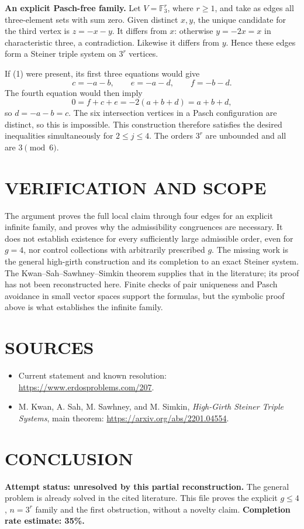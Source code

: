 \textbf{An explicit Pasch-free family.} Let $V=\mathbb F_3^r$, where $r\geq1$, and take as edges all three-element sets with sum zero. Given distinct $x,y$, the unique candidate for the third vertex is $z=-x-y$. It differs from $x$: otherwise $y=-2x=x$ in characteristic three, a contradiction. Likewise it differs from $y$. Hence these edges form a Steiner triple system on $3^r$ vertices.

If (1) were present, its first three equations would give
\[
c=-a-b,\qquad e=-a-d,\qquad f=-b-d.
\]
The fourth equation would then imply
\[
0=f+c+e=-2(a+b+d)=a+b+d,
\]
so $d=-a-b=c$. The six intersection vertices in a Pasch configuration are distinct, so this is impossible. This construction therefore satisfies the desired inequalities simultaneously for $2\leq j\leq4$. The orders $3^r$ are unbounded and all are $3\pmod6$.

\section{VERIFICATION AND SCOPE}
The argument proves the full local claim through four edges for an explicit infinite family, and proves why the admissibility congruences are necessary. It does not establish existence for every sufficiently large admissible order, even for $g=4$, nor control collections with arbitrarily prescribed $g$. The missing work is the general high-girth construction and its completion to an exact Steiner system. The Kwan--Sah--Sawhney--Simkin theorem supplies that in the literature; its proof has not been reconstructed here. Finite checks of pair uniqueness and Pasch avoidance in small vector spaces support the formulas, but the symbolic proof above is what establishes the infinite family.

\section{SOURCES}
\begin{itemize}
\item Current statement and known resolution: \url{https://www.erdosproblems.com/207}.
\item M. Kwan, A. Sah, M. Sawhney, and M. Simkin, \emph{High-Girth Steiner Triple Systems}, main theorem: \url{https://arxiv.org/abs/2201.04554}.
\end{itemize}
\section{CONCLUSION}
\textbf{Attempt status: unresolved by this partial reconstruction.} The general problem is already solved in the cited literature. This file proves the explicit $g\leq4$, $n=3^r$ family and the first obstruction, without a novelty claim.
\textbf{Completion rate estimate: 35\%.}
